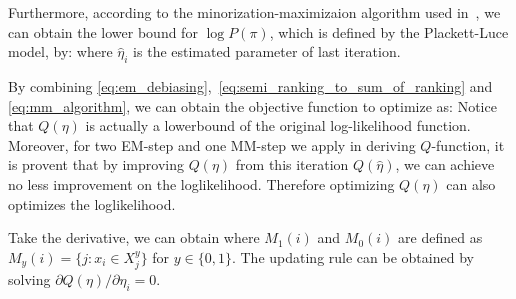 

Furthermore, according to the minorization-maximizaion algorithm used in~\cite{hunter:aos2004}, 
we can obtain the lower bound for $\log P(\pi)$, which is defined by the Plackett-Luce model, by:
%
where $\hat{\eta}_i$ is the estimated parameter of last iteration.  



By combining \eqref{eq:em_debiasing},~\eqref{eq:semi_ranking_to_sum_of_ranking} and \eqref{eq:mm_algorithm}, 
we can obtain the objective function to optimize as:
%
Notice that $Q(\eta)$ is actually a lowerbound of the original log-likelihood function.  
Moreover, for two EM-step and one MM-step we apply in deriving $Q$-function, 
it is provent that by improving $Q(\eta)$ from this iteration $Q(\hat{\eta})$, 
we can achieve no less improvement on the loglikelihood.  
Therefore optimizing $Q(\eta)$ can also optimizes the loglikelihood.  



Take the derivative, we can obtain
%
where $M_1(i)$ and $M_0(i)$ are defined as $M_y(i) = \{j:x_i \in X_j^y\}$ for $y \in \{0, 1\}$.  
The updating rule can be obtained by solving $\partial Q(\eta) / \partial \eta_i = 0$.  

